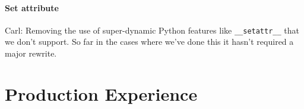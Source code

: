 \documentclass[english,cleveref,submission]{programming}
\newcommand{\code}[1]{\texttt{#1}}
\begin{document}
\paragraph{Set attribute}

Carl: Removing the use of super-dynamic Python features like
\code{\_\_setattr\_\_} that we don’t support. So far in the cases where
we’ve done this it hasn’t required a major rewrite.


\section{Production Experience}
\label{s:eval}






\end{document}

